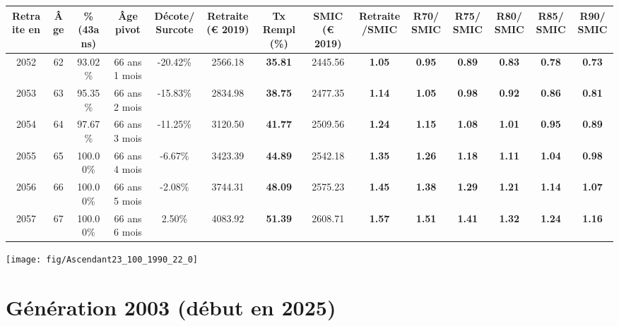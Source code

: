 \begin{adjustbox}{max width=\textwidth} 
\begin{tabular}[htb]{|c|c||c|c|c||c|c||c|c||c|c|c|c|c|} 
\hline 
 Retraite en &  Âge &  \%(43ans) &  Âge pivot &  Décote/Surcote &  Retraite (\euro{} 2019) &  Tx Rempl(\%) &  SMIC (\euro{} 2019) &  Retraite/SMIC &  R70/SMIC &  R75/SMIC &  R80/SMIC &  R85/SMIC &  R90/SMIC \\ 
\hline \hline 
 2052 &  62 &  93.02\% &  66 ans 1 mois &  -20.42\% &  2566.18 &  {\bf 35.81} &  2445.56 &  {\bf 1.05} &  {\bf {\color{red} 0.95}} &  {\bf {\color{red} 0.89}} &  {\bf {\color{red} 0.83}} &  {\bf {\color{red} 0.78}} &  {\bf {\color{red} 0.73}} \\ 
\hline 
 2053 &  63 &  95.35\% &  66 ans 2 mois &  -15.83\% &  2834.98 &  {\bf 38.75} &  2477.35 &  {\bf 1.14} &  {\bf 1.05} &  {\bf {\color{red} 0.98}} &  {\bf {\color{red} 0.92}} &  {\bf {\color{red} 0.86}} &  {\bf {\color{red} 0.81}} \\ 
\hline 
 2054 &  64 &  97.67\% &  66 ans 3 mois &  -11.25\% &  3120.50 &  {\bf 41.77} &  2509.56 &  {\bf 1.24} &  {\bf 1.15} &  {\bf 1.08} &  {\bf 1.01} &  {\bf {\color{red} 0.95}} &  {\bf {\color{red} 0.89}} \\ 
\hline 
 2055 &  65 &  100.00\% &  66 ans 4 mois &  -6.67\% &  3423.39 &  {\bf 44.89} &  2542.18 &  {\bf 1.35} &  {\bf 1.26} &  {\bf 1.18} &  {\bf 1.11} &  {\bf 1.04} &  {\bf {\color{red} 0.98}} \\ 
\hline 
 2056 &  66 &  100.00\% &  66 ans 5 mois &  -2.08\% &  3744.31 &  {\bf 48.09} &  2575.23 &  {\bf 1.45} &  {\bf 1.38} &  {\bf 1.29} &  {\bf 1.21} &  {\bf 1.14} &  {\bf 1.07} \\ 
\hline 
 2057 &  67 &  100.00\% &  66 ans 6 mois &  2.50\% &  4083.92 &  {\bf 51.39} &  2608.71 &  {\bf 1.57} &  {\bf 1.51} &  {\bf 1.41} &  {\bf 1.32} &  {\bf 1.24} &  {\bf 1.16} \\ 
\hline 
\hline 
\end{tabular} 
\end{adjustbox} 
 
 \vspace{0.1cm} 

 {\hspace{-2.2cm}\texttt{[image: fig/Ascendant23\_100\_1990\_22\_0]}} 

\newpage 
 
\section{Génération 2003 (début en 2025)\label{Ascendant23_100_2003_22_0}} 
 
